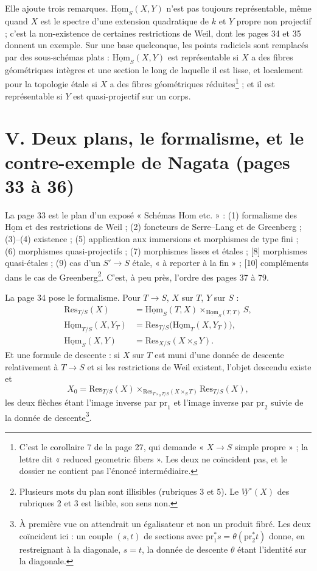 \documentclass[11pt,a4paper]{article}
\begin{document}
Elle ajoute trois remarques. $\underline{\mathrm{Hom}}_S(X,Y)$ n'est pas toujours
représentable, même quand $X$ est le spectre d'une extension quadratique de
$k$ et $Y$ propre non projectif ; c'est la non-existence de certaines
restrictions de Weil, dont les pages 34 et 35 donnent un exemple. Sur une base
quelconque, les points radiciels sont remplacés par des sous-schémas plats :
$\underline{\mathrm{Hom}}_S(X,Y)$ est représentable si $X$ a des fibres
géométriques intègres et une section le long de laquelle il est lisse, et
localement pour la topologie étale si $X$ a des fibres géométriques
réduites\footnote{C'est le corollaire 7 de la page 27, qui demande « $X \to S$
simple propre » ; la lettre dit « reduced geometric fibers ». Les deux ne
coïncident pas, et le dossier ne contient pas l'énoncé intermédiaire.} ; et il
est représentable si $Y$ est quasi-projectif sur un corps.

\section*{V. Deux plans, le formalisme, et le contre-exemple de Nagata (pages 33 à 36)}

La page 33 est le plan d'un exposé « Schémas Hom etc. » : (1) formalisme des
$\underline{\mathrm{Hom}}$ et des restrictions de Weil ; (2) foncteurs de
Serre--Lang et de Greenberg ; (3)--(4) existence ; (5) application aux
immersions et morphismes de type fini ; (6) morphismes quasi-projectifs ;
(7) morphismes lisses et étales ; [8] morphismes quasi-étales ; (9) cas d'un
$S' \to S$ étale, « à reporter à la fin » ; [10] compléments dans le cas de
Greenberg\footnote{Plusieurs mots du plan sont illisibles (rubriques 3 et 5). Le
$\underline{W}^{\circ}(X)$ des rubriques 2 et 3 est lisible, son sens non.}. C'est,
à peu près, l'ordre des pages 37 à 79.

La page 34 pose le formalisme. Pour $T \to S$, $X$ sur $T$, $Y$ sur $S$ :
\begin{align*}
  \mathrm{Res}_{T/S}(X) &= \underline{\mathrm{Hom}}_S(T, X) \times_{\underline{\mathrm{Hom}}_S(T,T)} S,\\
  \underline{\mathrm{Hom}}_{T/S}(X, Y_T) &= \mathrm{Res}_{T/S}\bigl(\underline{\mathrm{Hom}}_T(X, Y_T)\bigr),\\
  \underline{\mathrm{Hom}}_S(X,Y) &= \mathrm{Res}_{X/S}(X \times_S Y).
\end{align*}
Et une formule de descente : si $X$ sur $T$ est muni d'une donnée de descente
relativement à $T \to S$ et si les restrictions de Weil existent, l'objet
descendu existe et
\[
  X_0 = \mathrm{Res}_{T/S}(X) \times_{\mathrm{Res}_{T \times_S T/S}(X \times_S T)} \mathrm{Res}_{T/S}(X),
\]
les deux flèches étant l'image inverse par $\mathrm{pr}_1$ et l'image inverse
par $\mathrm{pr}_2$ suivie de la donnée de descente\footnote{À première vue
on attendrait un égalisateur et non un produit fibré. Les deux coïncident
ici : un couple $(s, t)$ de sections avec $\mathrm{pr}_1^{*}s =
\theta(\mathrm{pr}_2^{*}t)$ donne, en restreignant à la diagonale, $s = t$, la
donnée de descente $\theta$ étant l'identité sur la diagonale.}.
\end{document}
